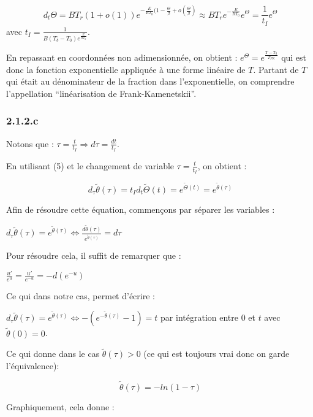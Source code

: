 \documentclass[10pt,a4paper,twocolumn]{article}
\begin{document}
$$ d_t\Theta = BT_r(1+o(1))e^{-\frac{E}{RT_0}(1-\frac{\Theta}{\beta} + o(\frac{\Theta}{\beta})} \approx B T_r e^{-\frac{E}{RT_0}} e^{\Theta} = \frac{1}{t_I}e^{\Theta} $$
avec $t_I = \frac{1}{B(T_b-T_0)e^{\frac{E}{RT_0}}}$.

En repassant en coordonnées non adimensionnée, on obtient : $e^{\Theta} = e^{\frac{T-T_0}{T_{FK}}}$ qui est donc la fonction exponentielle appliquée à une forme linéaire de $T$. Partant de $T$ qui était au dénominateur de la fraction dans l'exponentielle, on comprendre l'appellation “linéarisation de Frank-Kamenetskii”.

\subsubsection{2.1.2.c}

Notons que : $\tau = \frac{t}{t_I} \Rightarrow d\tau = \frac{dt}{t_I} $.

En utilisant (5) et le changement de variable $\tau = \frac{t}{t_I}$, on obtient : 

$$ d_{\tau}\tilde{\theta}(\tau) = t_I d_{t}\tilde{\Theta}(t) = e^{\tilde{\Theta}(t)} = e^{\tilde{\theta}(\tau)} $$

Afin de résoudre cette équation, commençons par séparer les variables : 

$ d_{\tau}\tilde{\theta}(\tau) = e^{\tilde{\theta}(\tau)} \Leftrightarrow \frac{d\tilde{\theta}(\tau)}{e^{\tilde{\theta}(\tau)} } = d\tau $

Pour résoudre cela, il suffit de remarquer que :

$ \frac{u'}{e^u} = \frac{u'}{e^{-u}} = - d(e^{-u})$

Ce qui dans notre cas, permet d'écrire :

$ d_{\tau}\tilde{\theta}(\tau) = e^{\tilde{\theta}(\tau)} \Leftrightarrow  - (e^{-\tilde{\theta}(\tau)} - 1) = t $ par intégration entre $0$ et $t$ avec $\tilde{\theta}(0) = 0$.

Ce qui donne dans le cas $\tilde{\theta}(\tau) > 0$ (ce qui est toujours vrai donc on garde l'équivalence):  

$$\tilde{\theta}(\tau) = - ln(1-\tau)$$

Graphiquement, cela donne :


\end{document}

